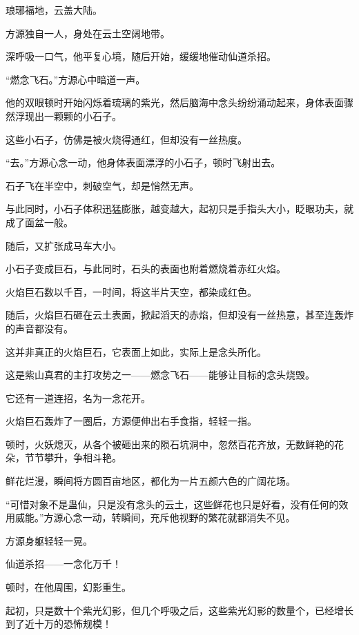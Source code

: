 
\begin{this_body}



琅琊福地，云盖大陆。

方源独自一人，身处在云土空阔地带。

深呼吸一口气，他平复心境，随后开始，缓缓地催动仙道杀招。

“燃念飞石。”方源心中暗道一声。

他的双眼顿时开始闪烁着琉璃的紫光，然后脑海中念头纷纷涌动起来，身体表面骤然浮现出一颗颗的小石子。

这些小石子，仿佛是被火烧得通红，但却没有一丝热度。

“去。”方源心念一动，他身体表面漂浮的小石子，顿时飞射出去。

石子飞在半空中，刺破空气，却是悄然无声。

与此同时，小石子体积迅猛膨胀，越变越大，起初只是手指头大小，眨眼功夫，就成了面盆一般。

随后，又扩张成马车大小。

小石子变成巨石，与此同时，石头的表面也附着燃烧着赤红火焰。

火焰巨石数以千百，一时间，将这半片天空，都染成红色。

随后，火焰巨石砸在云土表面，掀起滔天的赤焰，但却没有一丝热意，甚至连轰炸的声音都没有。

这并非真正的火焰巨石，它表面上如此，实际上是念头所化。

这是紫山真君的主打攻势之一——燃念飞石——能够让目标的念头烧毁。

它还有一道连招，名为一念花开。

火焰巨石轰炸了一圈后，方源便伸出右手食指，轻轻一指。

顿时，火妖熄灭，从各个被砸出来的陨石坑洞中，忽然百花齐放，无数鲜艳的花朵，节节攀升，争相斗艳。

鲜花烂漫，瞬间将方圆百亩地区，都化为一片五颜六色的广阔花场。

“可惜对象不是蛊仙，只是没有念头的云土，这些鲜花也只是好看，没有任何的效用威能。”方源心念一动，转瞬间，充斥他视野的繁花就都消失不见。

方源身躯轻轻一晃。

仙道杀招——一念化万千！

顿时，在他周围，幻影重生。

起初，只是数十个紫光幻影，但几个呼吸之后，这些紫光幻影的数量个，已经增长到了近十万的恐怖规模！


\end{this_body}

